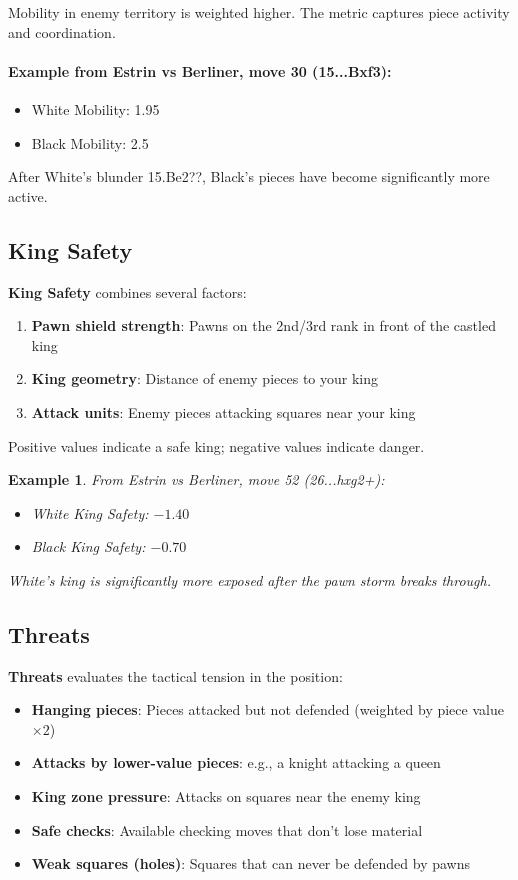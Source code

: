\documentclass[12pt]{book}
\newtheorem{example}{Example}[section]
\begin{document}
Mobility in enemy territory is weighted higher. The metric captures piece activity and coordination.

\paragraph{Example from Estrin vs Berliner, move 30 (15...Bxf3):}
\begin{itemize}
    \item White Mobility: 1.95
    \item Black Mobility: 2.5
\end{itemize}
After White's blunder 15.Be2??, Black's pieces have become significantly more active.

\subsection{King Safety}

\textbf{King Safety} combines several factors:

\begin{enumerate}
    \item \textbf{Pawn shield strength}: Pawns on the 2nd/3rd rank in front of the castled king
    \item \textbf{King geometry}: Distance of enemy pieces to your king
    \item \textbf{Attack units}: Enemy pieces attacking squares near your king
\end{enumerate}

Positive values indicate a safe king; negative values indicate danger.

\begin{example} From Estrin vs Berliner, move 52 (26...hxg2+):
\begin{itemize}
    \item White King Safety: $-1.40$
    \item Black King Safety: $-0.70$
\end{itemize}
White's king is significantly more exposed after the pawn storm breaks through.
\end{example}

\subsection{Threats}

\textbf{Threats} evaluates the tactical tension in the position:

\begin{itemize}
    \item \textbf{Hanging pieces}: Pieces attacked but not defended (weighted by piece value $\times 2$)
    \item \textbf{Attacks by lower-value pieces}: e.g., a knight attacking a queen
    \item \textbf{King zone pressure}: Attacks on squares near the enemy king
    \item \textbf{Safe checks}: Available checking moves that don't lose material
    \item \textbf{Weak squares (holes)}: Squares that can never be defended by pawns
\end{itemize}
\end{document}
